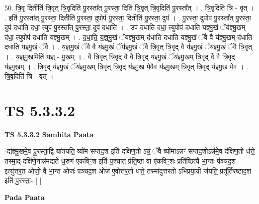 \documentclass[17pt]{extarticle}
\begin{document}
50. त्रि॒वृ दितीति॑ त्रि॒वृत् त्रि॒वृदिति॑ पु॒रस्ता᳚त् पु॒रस्ता॒ दिति॑ त्रि॒वृत् त्रि॒वृदिति॑ पु॒रस्ता᳚त् । . त्रि॒वृदिति॑ त्रि - वृत् । . इति॑ पु॒रस्ता᳚त् पु॒रस्ता॒ दितीति॑ पु॒रस्ता॒ दुपोप॑ पु॒रस्ता॒ दितीति॑ पु॒रस्ता॒ दुप॑ । . पु॒रस्ता॒ दुपोप॑ पु॒रस्ता᳚त् पु॒रस्ता॒ दुप॑ दधाति दधा॒ त्युप॑ पु॒रस्ता᳚त् पु॒रस्ता॒ दुप॑ दधाति । . उप॑ दधाति दधा॒ त्युपोप॑ दधाति यज्ञ्मु॒खं ॅय॑ज्ञ्मु॒खम् द॑धा॒ त्युपोप॑ दधाति यज्ञ्मु॒खम् । . द॒धा॒ति॒ य॒ज्ञ्॒मु॒खं ॅय॑ज्ञ्मु॒खम् द॑धाति दधाति यज्ञ्मु॒खं ॅवै वै य॑ज्ञ्मु॒खम् द॑धाति दधाति यज्ञ्मु॒खं ॅवै । . य॒ज्ञ्॒मु॒खं ॅवै वै य॑ज्ञ्मु॒खं ॅय॑ज्ञ्मु॒खं ॅवै त्रि॒वृत् त्रि॒वृद् वै य॑ज्ञ्मु॒खं ॅय॑ज्ञ्मु॒खं ॅवै त्रि॒वृत् । . य॒ज्ञ्॒मु॒खमिति॑ यज्ञ् - मु॒खम् । . वै त्रि॒वृत् त्रि॒वृद् वै वै त्रि॒वृद् य॑ज्ञ्मु॒खं ॅय॑ज्ञ्मु॒खम् त्रि॒वृद् वै वै त्रि॒वृद् य॑ज्ञ्मु॒खम् । . त्रि॒वृद् य॑ज्ञ्मु॒खं ॅय॑ज्ञ्मु॒खम् त्रि॒वृत् त्रि॒वृद् य॑ज्ञ्मु॒ख मे॒वैव य॑ज्ञ्मु॒खम् त्रि॒वृत् त्रि॒वृद् य॑ज्ञ्मु॒ख मे॒व । . त्रि॒वृदिति॑ त्रि - वृत् । \newline
\pagebreak
{}

\section{ TS 5.3.3.2 }

\textbf{TS 5.3.3.2 } \newline
\textbf{Samhita Paata} \newline

-द्य॑ज्ञ्मु॒खमे॒व पु॒रस्ता॒द्वि या॑तयति॒ व्यो॑म सप्तद॒श इति॑ दक्षिण॒तो ऽन्नं॒ ॅवै व्यो॑माऽन्नꣳ॑ सप्तद॒शोऽन्न॑मे॒व द॑क्षिण॒तो ध॑त्ते॒ तस्मा॒द्-दक्षि॑णे॒नान्न॑मद्यते ध॒रुण॑ एकविꣳ॒॒श इति॑ प॒श्चात् प्र॑ति॒ष्ठा वा ए॑कविꣳ॒॒शः प्रति॑ष्ठित्यै भा॒न्तः प॑ञ्चद॒श इत्यु॑त्तर॒त ओजो॒ वै भा॒न्त ओजः॑ पञ्चद॒श ओज॑ ए॒वोत्त॑र॒तो ध॑त्ते॒ तस्मा॑दुत्तरतो ऽभिप्रया॒यी ज॑यति॒ प्रतू᳚र्तिरष्टाद॒श इति॑ पु॒रस्ता॒- [  ] \newline

\textbf{Pada Paata} \newline
\end{document}
